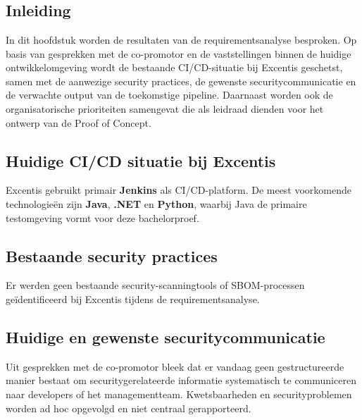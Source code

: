 
\chapter{}%
\label{ch:Resultaten van de requirementsanalyse}
\section{Inleiding}

In dit hoofdstuk worden de resultaten van de requirementsanalyse besproken. Op basis van gesprekken met de co-promotor en de vaststellingen binnen de huidige ontwikkelomgeving wordt de bestaande CI/CD-situatie bij Excentis geschetst, samen met de aanwezige security practices, de gewenste securitycommunicatie en de verwachte output van de toekomstige pipeline. Daarnaast worden ook de organisatorische prioriteiten samengevat die als leidraad dienden voor het ontwerp van de Proof of Concept.

\section{Huidige CI/CD situatie bij Excentis}

Excentis gebruikt primair \textbf{Jenkins} als CI/CD-platform. De meest voorkomende technologieën zijn \textbf{Java}, \textbf{.NET} en \textbf{Python}, waarbij Java de primaire testomgeving vormt voor deze bachelorproef.

\section{Bestaande security practices}

Er werden geen bestaande security-scanningtools of SBOM-processen geïdentificeerd bij Excentis tijdens de requirementsanalyse.

\section{Huidige en gewenste securitycommunicatie}

Uit gesprekken met de co-promotor bleek dat er vandaag geen gestructureerde manier bestaat om securitygerelateerde informatie systematisch te communiceren naar developers of het managementteam. Kwetsbaarheden en securityproblemen worden ad hoc opgevolgd en niet centraal gerapporteerd.

